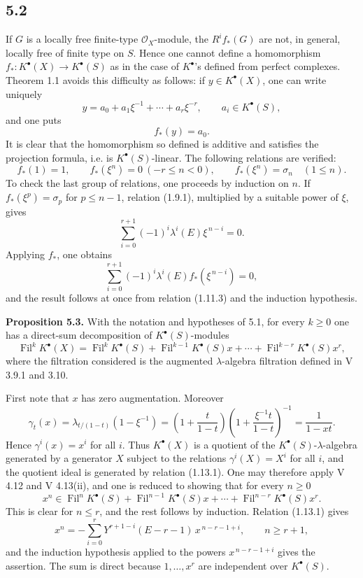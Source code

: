 \documentclass[11pt]{article}
\newcommand{\Fil}{\operatorname{Fil}}
\begin{document}
\subsection*{5.2}
If \(G\) is a locally free finite-type \(\mathcal O_X\)-module, the \(R^if_*(G)\) are not, in general, locally free of finite type on \(S\). Hence one cannot define a homomorphism \(f_*:K^\bullet(X)\to K^\bullet(S)\) as in the case of \(K^\bullet\)'s defined from perfect complexes. Theorem 1.1 avoids this difficulty as follows: if \(y\in K^\bullet(X)\), one can write uniquely
\begin{equation}\tag{5.2.1}
  y=a_0+a_1\xi^{-1}+\cdots+a_r\xi^{-r},
  \qquad a_i\in K^\bullet(S),
\end{equation}
and one puts
\begin{equation}\tag{5.2.2}
  f_*(y)=a_0 .
\end{equation}
It is clear that the homomorphism so defined is additive and satisfies the projection formula, i.e. is \(K^\bullet(S)\)-linear. The following relations are verified:
\begin{equation}\tag{5.2.3}
 f_*(1)=1,\qquad f_*(\xi^n)=0\ (-r\leq n<0),\qquad
 f_*(\xi^n)=\sigma_n\quad (1\leq n).
\end{equation}
To check the last group of relations, one proceeds by induction on \(n\). If \(f_*(\xi^p)=\sigma_p\) for \(p\leq n-1\), relation (1.9.1), multiplied by a suitable power of \(\xi\), gives
\[
  \sum_{i=0}^{r+1}(-1)^i\lambda^i(E)\xi^{\,n-i}=0.
\]
Applying \(f_*\), one obtains
\[
  \sum_{i=0}^{r+1}(-1)^i\lambda^i(E)f_*(\xi^{\,n-i})=0,
\]
and the result follows at once from relation (1.11.3) and the induction hypothesis.

\textbf{Proposition 5.3.} With the notation and hypotheses of 5.1, for every \(k\geq0\) one has a direct-sum decomposition of \(K^\bullet(S)\)-modules
\[
  \Fil^kK^\bullet(X)=
  \Fil^kK^\bullet(S)+\Fil^{k-1}K^\bullet(S)x+\cdots+
  \Fil^{k-r}K^\bullet(S)x^r,
\]
where the filtration considered is the augmented \(\lambda\)-algebra filtration defined in V 3.9.1 and 3.10.

First note that \(x\) has zero augmentation. Moreover
\[
  \gamma_t(x)
  =\lambda_{t/(1-t)}(1-\xi^{-1})
  =\left(1+\frac{t}{1-t}\right)\left(1+\frac{\xi^{-1}t}{1-t}\right)^{-1}
  =\frac{1}{1-xt}.
\]
Hence \(\gamma^i(x)=x^i\) for all \(i\). Thus \(K^\bullet(X)\) is a quotient of the \(K^\bullet(S)\)-\(\lambda\)-algebra generated by a generator \(X\) subject to the relations \(\gamma^i(X)=X^i\) for all \(i\), and the quotient ideal is generated by relation (1.13.1). One may therefore apply V 4.12 and V 4.13(ii), and one is reduced to showing that for every \(n\geq0\)
\[
  x^n\in \Fil^nK^\bullet(S)+\Fil^{n-1}K^\bullet(S)x+\cdots+\Fil^{n-r}K^\bullet(S)x^r.
\]
This is clear for \(n\leq r\), and the rest follows by induction. Relation (1.13.1) gives
\[
  x^n=-\sum_{i=0}^{r}Y^{r+1-i}(E-r-1)\,x^{\,n-r-1+i},
  \qquad n\geq r+1,
\]
and the induction hypothesis applied to the powers \(x^{\,n-r-1+i}\) gives the assertion. The sum is direct because \(1,\ldots,x^r\) are independent over \(K^\bullet(S)\).
\end{document}
